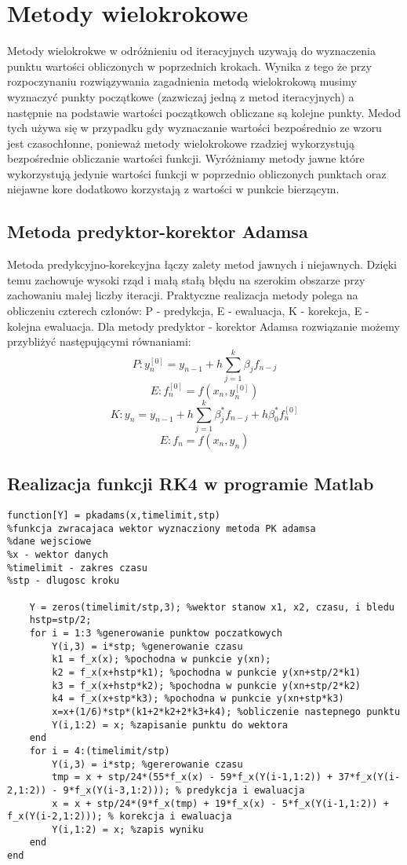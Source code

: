 \documentclass[a4paper, 11pt]{article}
\begin{document}
\section{Metody wielokrokowe}
Metody wielokrokwe w odróżnieniu od iteracyjnych uzywają do wyznaczenia punktu wartości obliczonych w poprzednich krokach. Wynika z tego że przy rozpoczynaniu rozwiązywania zagadnienia metodą wielokrokową musimy wyznaczyć punkty początkowe (zazwiczaj jedną z metod iteracyjnych) a następnie na podstawie wartości początkowch obliczane są kolejne punkty. Medod tych używa się w przypadku gdy wyznaczanie wartości bezpośrednio ze wzoru jest czasochłonne, ponieważ metody wielokrokowe rzadziej wykorzystują bezpośrednie obliczanie wartości funkcji. Wyróżniamy metody jawne które wykorzystują jedynie wartości funkcji w poprzednio obliczonych punktach oraz niejawne kore dodatkowo korzystają z wartości w punkcie bierzącym. 

\subsection{Metoda predyktor-korektor Adamsa}
Metoda predykcyjno-korekcyjna łączy zalety metod jawnych i niejawnych. Dzięki temu zachowuje wysoki rząd i małą stałą błędu na szerokim obszarze przy zachowaniu małej liczby iteracji. Praktyczne realizacja metody polega na obliczeniu czterech członów: P - predykcja, E - ewaluacja, K - korekcja, E - kolejna ewaluacja. Dla metody predyktor - korektor Adamsa rozwiązanie możemy przybliżyć następującymi równaniami: 
$$P:  y_{n}^{[0]} = y_{n-1} + h \sum_{j=1}^{k} \beta_{j}f_{n-j}$$
$$E:  f_{n}^{[0]} = f(x_{n},y_{n}^{[0]})$$
$$K:  y_{n} = y_{n-1} + h \sum_{j=1}^{k} \beta_{j}^{*}f_{n-j}+h\beta_{0}^{*}f_{n}^{[0]}$$
$$E:  f_{n} = f(x_{n},y_{n})$$


\subsection{Realizacja funkcji RK4 w programie Matlab}
\begin{lstlisting}
function[Y] = pkadams(x,timelimit,stp)
%funkcja zwracajaca wektor wyznacziony metoda PK adamsa
%dane wejsciowe
%x - wektor danych 
%timelimit - zakres czasu
%stp - dlugosc kroku
   
    Y = zeros(timelimit/stp,3); %wektor stanow x1, x2, czasu, i bledu
    hstp=stp/2;
    for i = 1:3 %generowanie punktow poczatkowych
        Y(i,3) = i*stp; %generowanie czasu
        k1 = f_x(x); %pochodna w punkcie y(xn);
        k2 = f_x(x+hstp*k1); %pochodna w punkcie y(xn+stp/2*k1) 
        k3 = f_x(x+hstp*k2); %pochodna w punkcie y(xn+stp/2*k2)
        k4 = f_x(x+stp*k3); %pochodna w punkcie y(xn+stp*k3)
        x=x+(1/6)*stp*(k1+2*k2+2*k3+k4); %obliczenie nastepnego punktu
        Y(i,1:2) = x; %zapisanie punktu do wektora
    end
    for i = 4:(timelimit/stp)
        Y(i,3) = i*stp; %gererowanie czasu
        tmp = x + stp/24*(55*f_x(x) - 59*f_x(Y(i-1,1:2)) + 37*f_x(Y(i-2,1:2)) - 9*f_x(Y(i-3,1:2))); % predykcja i ewaluacja
        x = x + stp/24*(9*f_x(tmp) + 19*f_x(x) - 5*f_x(Y(i-1,1:2)) + f_x(Y(i-2,1:2))); % korekcja i ewaluacja
        Y(i,1:2) = x; %zapis wyniku
    end
end
\end{lstlisting}
\end{document}
